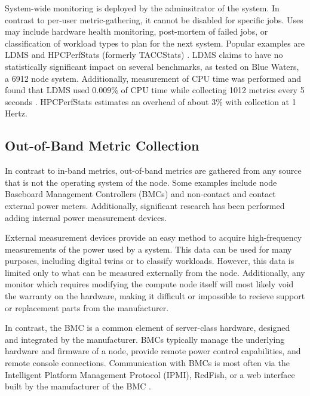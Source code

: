 \documentclass[conference]{IEEEtran}
\begin{document}
System-wide monitoring is deployed by the adminsitrator of the system. In 
contrast to per-user metric-gathering, it cannot be disabled for specific jobs. 
Uses may include hardware health monitoring, post-mortem of failed jobs, or 
classification of workload types to plan for the next system. Popular examples 
are LDMS\cite{agelastosLightweightDistributedMetric2014} and HPCPerfStats
(formerly TACCStats)
\cite{evansComprehensiveResourceUse2014,TACCHPCPerfStats2026}. 
 LDMS claims to have no statistically significant impact on several 
benchmarks\cite{LightweightDistributedMetric}, as tested on Blue Waters, a 6912 
node system. Additionally, measurement of CPU time was performed and found that 
LDMS used 0.009\% of CPU time while collecting 1012 metrics every 5 seconds
\cite{brandtHighFidelityData}. HPCPerfStats estimates an overhead of about 3\% 
with collection at 1 Hertz\cite{TACCHPCPerfStats2026}.

\subsection{Out-of-Band Metric Collection}

In contrast to in-band metrics, out-of-band metrics are gathered from any source
that is not the operating system of the node. Some examples include node 
Baseboard Management Controllers (BMCs)
\cite{liMonSTerOutoftheBoxMonitoring2020,cockEnzianOpenGeneral2022a} and 
non-contact\cite{kamilPowerEfficiencyHigh2008} and 
contact\cite{asgherEvaluatingHardwareSoftware2025,ilschePowerMeasurementTechniques2019} external power 
meters. Additionally, significant research has been performed adding internal power 
measurement devices\cite{ilschePowerMeasurementsCompute2015,larosPowerInsightCommodityPower2013,vlugtPowerSensor3FastAccurate2025}.

External measurement devices provide an easy method to acquire 
high-frequency measurements of the power used by a system. This data can be 
used for many purposes, including 
digital twins\cite{brewerDigitalTwinFramework2024}
 or to classify workloads\cite{kohlerRecognizingHPCWorkloads2021}.
However, this data is limited only to what can be measured externally from the 
node. Additionally, any monitor which requires modifying the compute node 
itself will most likely void the warranty on the hardware, making it difficult 
or impossible to recieve support or replacement parts from the manufacturer.

In contrast, the BMC is a common element of server-class hardware, designed and 
integrated by the manufacturer.
BMCs typically manage the underlying hardware and firmware of a node, provide remote power 
control capabilities, and remote console connections. Communication with BMCs 
is most often via the Intelligent Platform Management Protocol 
(IPMI)\cite{IPMIStandard}, RedFish\cite{RedfishSpecification}, 
or a web interface built by the manufacturer of the BMC
\cite{enterpriseLoggingILOWeb,PowerEdgeSetIDRAC10,HPEAgentlessManagement}.
\end{document}
